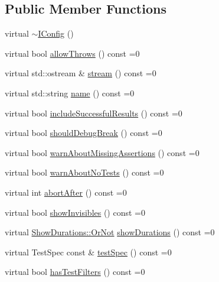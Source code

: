 \subsection*{Public Member Functions}
\begin{DoxyCompactItemize}
\item 
virtual \mbox{\hyperlink{struct_catch_1_1_i_config_adadf7c57478e4b0c83bea5b38d2dbc87}{$\sim$\+I\+Config}} ()
\item 
virtual bool \mbox{\hyperlink{struct_catch_1_1_i_config_aadb95f849359de1e6eb915aab063e542}{allow\+Throws}} () const =0
\item 
virtual std\+::ostream \& \mbox{\hyperlink{struct_catch_1_1_i_config_aa4c3fe0825e7e6ebdcfa6abc7abf3617}{stream}} () const =0
\item 
virtual std\+::string \mbox{\hyperlink{struct_catch_1_1_i_config_aa2315800a05c19db71518b1edc39d43b}{name}} () const =0
\item 
virtual bool \mbox{\hyperlink{struct_catch_1_1_i_config_a2f1b0391019b9ce69921527a684eab23}{include\+Successful\+Results}} () const =0
\item 
virtual bool \mbox{\hyperlink{struct_catch_1_1_i_config_a5b886c5aad9001e90f63a7cf0726af63}{should\+Debug\+Break}} () const =0
\item 
virtual bool \mbox{\hyperlink{struct_catch_1_1_i_config_a75d970c495a28e46b8e9b04a1d32149f}{warn\+About\+Missing\+Assertions}} () const =0
\item 
virtual bool \mbox{\hyperlink{struct_catch_1_1_i_config_a30590623e3918825f2896c2262bf6fe3}{warn\+About\+No\+Tests}} () const =0
\item 
virtual int \mbox{\hyperlink{struct_catch_1_1_i_config_a363f3388a439d02217f37198eff96744}{abort\+After}} () const =0
\item 
virtual bool \mbox{\hyperlink{struct_catch_1_1_i_config_aa288bf92ccd0aafd85409d8aefdf738c}{show\+Invisibles}} () const =0
\item 
virtual \mbox{\hyperlink{struct_catch_1_1_show_durations_a82fa0174554187220c1eda175f122ee1}{Show\+Durations\+::\+Or\+Not}} \mbox{\hyperlink{struct_catch_1_1_i_config_abaa97d281484278291f0d3db6d404aeb}{show\+Durations}} () const =0
\item 
virtual Test\+Spec const  \& \mbox{\hyperlink{struct_catch_1_1_i_config_a03a2fd8221d896d12bf3684ab2a03588}{test\+Spec}} () const =0
\item 
virtual bool \mbox{\hyperlink{struct_catch_1_1_i_config_a49a475bbeb3180c06799d6d958914649}{has\+Test\+Filters}} () const =0

\end{DoxyCompactItemize}
